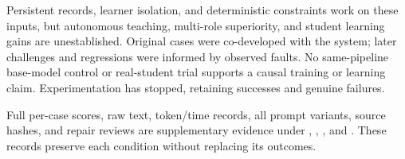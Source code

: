 Persistent records, learner isolation, and deterministic constraints work on these inputs, but autonomous teaching, multi-role superiority, and student learning gains are unestablished. Original cases were co-developed with the system; later challenges and regressions were informed by observed faults. No same-pipeline base-model control or real-student trial supports a causal training or learning claim. Experimentation has stopped, retaining successes and genuine failures.

Full per-case scores, raw text, token/time records, all prompt variants, source hashes, and repair reviews are supplementary evidence under , , , and . These records preserve each condition without replacing its outcomes.
